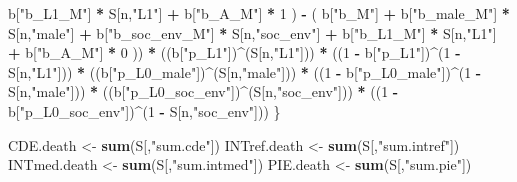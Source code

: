 \documentclass[
]{book}
\newenvironment{Shaded}{\begin{snugshade}}{\end{snugshade}}
\newcommand{\DecValTok}[1]{\textcolor[rgb]{0.00,0.00,0.81}{#1}}
\newcommand{\FunctionTok}[1]{\textcolor[rgb]{0.13,0.29,0.53}{\textbf{#1}}}
\newcommand{\NormalTok}[1]{#1}
\newcommand{\OtherTok}[1]{\textcolor[rgb]{0.56,0.35,0.01}{#1}}
\newcommand{\SpecialCharTok}[1]{\textcolor[rgb]{0.81,0.36,0.00}{\textbf{#1}}}
\newcommand{\StringTok}[1]{\textcolor[rgb]{0.31,0.60,0.02}{#1}}
\begin{document}
\begin{Shaded}
\begin{Highlighting}[]
\NormalTok{            b[}\StringTok{"b\_L1\_M"}\NormalTok{] }\SpecialCharTok{*}\NormalTok{ S[n,}\StringTok{"L1"}\NormalTok{] }\SpecialCharTok{+}
\NormalTok{            b[}\StringTok{"b\_A\_M"}\NormalTok{] }\SpecialCharTok{*} \DecValTok{1}\NormalTok{ ) }\SpecialCharTok{{-}} 
\NormalTok{          ( b[}\StringTok{"b\_M"}\NormalTok{] }\SpecialCharTok{+} 
\NormalTok{              b[}\StringTok{"b\_male\_M"}\NormalTok{] }\SpecialCharTok{*}\NormalTok{ S[n,}\StringTok{"male"}\NormalTok{] }\SpecialCharTok{+} 
\NormalTok{              b[}\StringTok{"b\_soc\_env\_M"}\NormalTok{] }\SpecialCharTok{*}\NormalTok{ S[n,}\StringTok{"soc\_env"}\NormalTok{] }\SpecialCharTok{+} 
\NormalTok{              b[}\StringTok{"b\_L1\_M"}\NormalTok{] }\SpecialCharTok{*}\NormalTok{ S[n,}\StringTok{"L1"}\NormalTok{] }\SpecialCharTok{+}
\NormalTok{              b[}\StringTok{"b\_A\_M"}\NormalTok{] }\SpecialCharTok{*} \DecValTok{0}\NormalTok{ )) }\SpecialCharTok{*} 
\NormalTok{      ((b[}\StringTok{"p\_L1"}\NormalTok{])}\SpecialCharTok{\^{}}\NormalTok{(S[n,}\StringTok{"L1"}\NormalTok{])) }\SpecialCharTok{*}
\NormalTok{      ((}\DecValTok{1} \SpecialCharTok{{-}}\NormalTok{ b[}\StringTok{"p\_L1"}\NormalTok{])}\SpecialCharTok{\^{}}\NormalTok{(}\DecValTok{1} \SpecialCharTok{{-}}\NormalTok{ S[n,}\StringTok{"L1"}\NormalTok{])) }\SpecialCharTok{*}
\NormalTok{      ((b[}\StringTok{"p\_L0\_male"}\NormalTok{])}\SpecialCharTok{\^{}}\NormalTok{(S[n,}\StringTok{"male"}\NormalTok{])) }\SpecialCharTok{*} 
\NormalTok{      ((}\DecValTok{1} \SpecialCharTok{{-}}\NormalTok{ b[}\StringTok{"p\_L0\_male"}\NormalTok{])}\SpecialCharTok{\^{}}\NormalTok{(}\DecValTok{1} \SpecialCharTok{{-}}\NormalTok{ S[n,}\StringTok{"male"}\NormalTok{])) }\SpecialCharTok{*} 
\NormalTok{      ((b[}\StringTok{"p\_L0\_soc\_env"}\NormalTok{])}\SpecialCharTok{\^{}}\NormalTok{(S[n,}\StringTok{"soc\_env"}\NormalTok{])) }\SpecialCharTok{*}
\NormalTok{      ((}\DecValTok{1} \SpecialCharTok{{-}}\NormalTok{ b[}\StringTok{"p\_L0\_soc\_env"}\NormalTok{])}\SpecialCharTok{\^{}}\NormalTok{(}\DecValTok{1} \SpecialCharTok{{-}}\NormalTok{ S[n,}\StringTok{"soc\_env"}\NormalTok{])) }
\NormalTok{    \}}
  
\NormalTok{  CDE.death }\OtherTok{\textless{}{-}} \FunctionTok{sum}\NormalTok{(S[,}\StringTok{"sum.cde"}\NormalTok{])}
\NormalTok{  INTref.death }\OtherTok{\textless{}{-}} \FunctionTok{sum}\NormalTok{(S[,}\StringTok{"sum.intref"}\NormalTok{])}
\NormalTok{  INTmed.death }\OtherTok{\textless{}{-}} \FunctionTok{sum}\NormalTok{(S[,}\StringTok{"sum.intmed"}\NormalTok{])}
\NormalTok{  PIE.death }\OtherTok{\textless{}{-}} \FunctionTok{sum}\NormalTok{(S[,}\StringTok{"sum.pie"}\NormalTok{])}
  

\end{Highlighting}
\end{Shaded}
\end{document}

